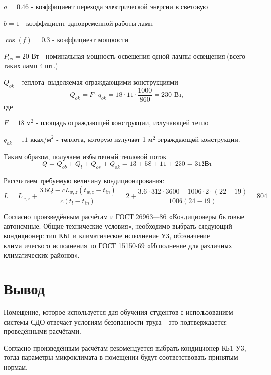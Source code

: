 $a = 0.46$ - коэффициент перехода электрической энергии в световую

$b = 1$ -  коэффициент одновременной работы ламп

$\cos(f) = 0.3$ - коэффициент мощности

$P_{os} = 20 \mbox{ Вт}$ -  номинальная мощность освещения одной лампы освещения
(всего таких ламп 4 шт.)

$Q_{ok}$ - теплота, выделяемая ограждающими конструкциями
$$
Q_{ok} = F\cdot q_{ok} = 18 \cdot 11 \cdot \frac{1000}{860} = 230 \mbox{ Вт},
$$
где

$F = 18 \mbox{ м}^2$  - площадь ограждающей конструкции, излучающей тепло

$q_{ok} = 11 \mbox{ ккал/м}^2$ -  теплота, которую излучает 1 м$^2$ ограждающей кон\-струкции.

Таким образом, получаем избыточный тепловой поток
$$
Q = Q_{ob} + Q_{l} + Q_{os} + Q_{ok}= 13 + 58 + 11 + 230 = 312 \mbox{Вт}
$$

Рассчитаем требуемую величину кондиционирования:
$$
L = L_{w,z} + \frac{3.6Q - cL_{w,z}(t_{w,z} - t_{in})}{c(t_{l}-t_{in})} = 2 + \frac{3.6\cdot312\cdot3600 - 1006\cdot2\cdot(22-19)}{1006(24-19)} = 804
$$

Согласно произведённым расчётам и ГОСТ 26963—86 «Кондиционеры бытовые авто\-номные. Общие технические условия», необходимо выбрать сле\-дующий кондиционер: тип КБ1 и климатическое исполнение У3, обозначение климатического исполнения по ГОСТ 15150-69 «Исполнение для различных климатических районов».

\section{Вывод}

Помещение, которое используется для обучения студентов с использо\-ванием системы СДО отвечает условиям безопасности труда - это подтвер\-ждается проведёнными расчётами. 

Согласно произведённым расчётам рекомендуется выбрать кондиционер КБ1 У3, тогда параметры микроклимата в помещении будут соответствовать принятым нормам.


 

